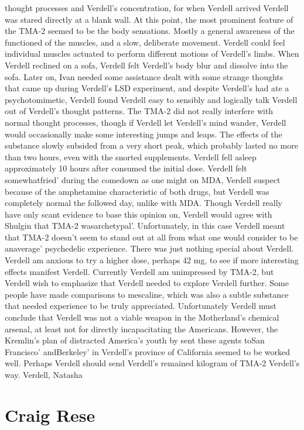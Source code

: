 \documentclass[12pt]{book}
\begin{document}
thought processes and Verdell's concentration, for when Verdell arrived Verdell was stared directly at a blank wall. At this point, the most prominent feature of the TMA-2 seemed to be the body sensations. Mostly a general awareness of the functioned of the muscles, and a slow, deliberate movement. Verdell could feel individual muscles actuated to perform different motions of Verdell's limbs. When Verdell reclined on a sofa, Verdell felt Verdell's body blur and dissolve into the sofa. Later on, Ivan needed some assistance dealt with some strange thoughts that came up during Verdell's LSD experiment, and despite Verdell's had ate a psychotomimetic, Verdell found Verdell easy to sensibly and logically talk Verdell out of Verdell's thought patterns. The TMA-2 did not really interfere with normal thought processes, though if Verdell let Verdell's mind wander, Verdell would occasionally make some interesting jumps and leaps. The effects of the substance slowly subsided from a very short peak, which probably lasted no more than two hours, even with the snorted supplements. Verdell fell asleep approximately 10 hours after consumed the initial dose. Verdell felt somewhatfried' during the comedown as one might on MDA, Verdell suspect because of the amphetamine characteristic of both drugs, but Verdell was completely normal the followed day, unlike with MDA. Though Verdell really have only scant evidence to base this opinion on, Verdell would agree with Shulgin that TMA-2 wasarchetypal'. Unfortunately, in this case Verdell meant that TMA-2 doesn't seem to stand out at all from what one would consider to be anaverage' psychedelic experience. There was just nothing special about Verdell. Verdell am anxious to try a higher dose, perhaps 42 mg, to see if more interesting effects manifest Verdell. Currently Verdell am unimpressed by TMA-2, but Verdell wish to emphasize that Verdell needed to explore Verdell further. Some people have made comparisons to mescaline, which was also a subtle substance that needed experience to be truly appreciated. Unfortunately Verdell must conclude that Verdell was not a viable weapon in the Motherland's chemical arsenal, at least not for directly incapacitating the Americans. However, the Kremlin's plan of distracted America's youth by sent these agents toSan Francisco' andBerkeley' in Verdell's province of California seemed to be worked well. Perhaps Verdell should send Verdell's remained kilogram of TMA-2 Verdell's way. Verdell, Natasha



\chapter{Craig Rese}
\end{document}
